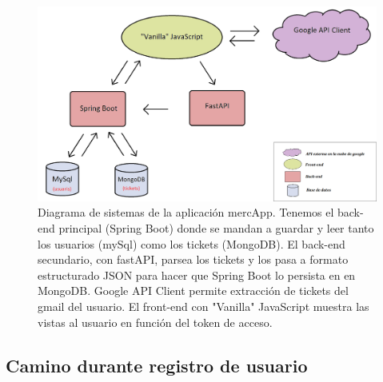 \documentclass[a4paper,12pt]{report}
\begin{document}
				
		\setlength{\belowcaptionskip}{3pt}
		\FloatBarrier
		\begin{figure}[H]
			\centering
			\includegraphics[width=1\textwidth]{img/diagramaSistemesAplicacioMercapp.png}
			\caption{Diagrama de sistemas de la aplicación mercApp. Tenemos el back-end principal (Spring Boot) donde se mandan a guardar y leer tanto los usuarios (mySql) como los tickets (MongoDB). El back-end secundario, con fastAPI, parsea los tickets y los pasa a formato estructurado JSON para hacer que Spring Boot lo persista en en MongoDB. Google API Client permite extracción de tickets del gmail del usuario. El front-end con "Vanilla" JavaScript muestra las vistas al usuario en función del token de acceso.}

			
			\label{fig:diagramaSistemesAplicacioMercapp} 
		\end{figure}
		\FloatBarrier
				
				
			\subsection{Camino durante registro de usuario}
				
\end{document}
